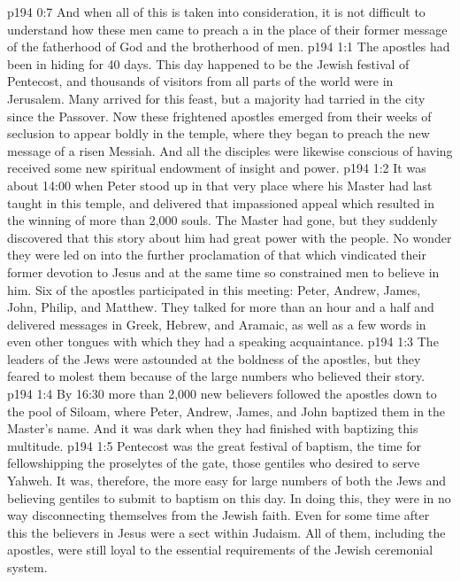 \vs p194 0:7 And when all of this is taken into consideration, it is not difficult to understand how these men came to preach a  in the place of their former message of the fatherhood of God and the brotherhood of men.
\vs p194 1:1 The apostles had been in hiding for 40 days. This day happened to be the Jewish festival of Pentecost, and thousands of visitors from all parts of the world were in Jerusalem. Many arrived for this feast, but a majority had tarried in the city since the Passover. Now these frightened apostles emerged from their weeks of seclusion to appear boldly in the temple, where they began to preach the new message of a risen Messiah. And all the disciples were likewise conscious of having received some new spiritual endowment of insight and power.
\vs p194 1:2 It was about 14:00 when Peter stood up in that very place where his Master had last taught in this temple, and delivered that impassioned appeal which resulted in the winning of more than 2,000 souls. The Master had gone, but they suddenly discovered that this story about him had great power with the people. No wonder they were led on into the further proclamation of that which vindicated their former devotion to Jesus and at the same time so constrained men to believe in him. Six of the apostles participated in this meeting: Peter, Andrew, James, John, Philip, and Matthew. They talked for more than an hour and a half and delivered messages in Greek, Hebrew, and Aramaic, as well as a few words in even other tongues with which they had a speaking acquaintance.
\vs p194 1:3 The leaders of the Jews were astounded at the boldness of the apostles, but they feared to molest them because of the large numbers who believed their story.
\vs p194 1:4 By 16:30 more than 2,000 new believers followed the apostles down to the pool of Siloam, where Peter, Andrew, James, and John baptized them in the Master’s name. And it was dark when they had finished with baptizing this multitude.
\vs p194 1:5 Pentecost was the great festival of baptism, the time for fellowshipping the proselytes of the gate, those gentiles who desired to serve Yahweh. It was, therefore, the more easy for large numbers of both the Jews and believing gentiles to submit to baptism on this day. In doing this, they were in no way disconnecting themselves from the Jewish faith. Even for some time after this the believers in Jesus were a sect within Judaism. All of them, including the apostles, were still loyal to the essential requirements of the Jewish ceremonial system.
